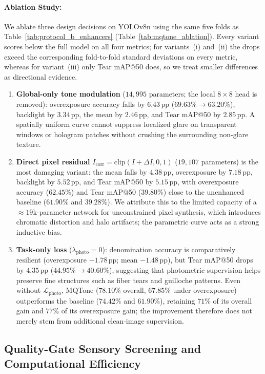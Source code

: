 \documentclass[final,5p,times,twocolumn,authoryear]{elsarticle}
\begin{document}
\paragraph{Ablation Study:}
We ablate three design decisions on YOLOv8n using the same five folds as Table~\ref{tab:protocol_b_enhancers} (Table~\ref{tab:mqtone_ablation}). Every variant scores below the full model on all four metrics; for variants~(i) and~(ii) the drops exceed the corresponding fold-to-fold standard deviations on every metric, whereas for variant~(iii) only Tear mAP@50 does, so we treat smaller differences as directional evidence.
\begin{enumerate}[label=(\roman*)]
    \item \textbf{Global-only tone modulation} ($14{,}995$ parameters; the local $8 \times 8$ head is removed): overexposure accuracy falls by $6.43$\,pp ($69.63\% \to 63.20\%$), backlight by $3.34$\,pp, the mean by $2.46$\,pp, and Tear mAP@50 by $2.85$\,pp. A spatially uniform curve cannot suppress localized glare on transparent windows or hologram patches without crushing the surrounding non-glare texture.
    \item \textbf{Direct pixel residual} $I_{\text{corr}} = \text{clip}(I + \Delta I, 0, 1)$ ($19{,}107$ parameters) is the most damaging variant: the mean falls by $4.38$\,pp, overexposure by $7.18$\,pp, backlight by $5.52$\,pp, and Tear mAP@50 by $5.15$\,pp, with overexposure accuracy ($62.45\%$) and Tear mAP@50 ($39.80\%$) close to the unenhanced baseline ($61.90\%$ and $39.28\%$). We attribute this to the limited capacity of a $\approx 19\text{k}$-parameter network for unconstrained pixel synthesis, which introduces chromatic distortion and halo artifacts; the parametric curve acts as a strong inductive bias.
    \item \textbf{Task-only loss} ($\lambda_{\text{photo}} = 0$): denomination accuracy is comparatively resilient (overexposure $-1.78$\,pp; mean $-1.48$\,pp), but Tear mAP@50 drops by $4.35$\,pp ($44.95\% \to 40.60\%$), suggesting that photometric supervision helps preserve fine structures such as fiber tears and guilloche patterns. Even without $\mathcal{L}_{\text{photo}}$, MQTone ($78.10\%$ overall, $67.85\%$ under overexposure) outperforms the baseline ($74.42\%$ and $61.90\%$), retaining $71\%$ of its overall gain and $77\%$ of its overexposure gain; the improvement therefore does not merely stem from additional clean-image supervision.
\end{enumerate}

\subsection{Quality-Gate Sensory Screening and Computational Efficiency}
\label{subsec:exp_quality_gate}
\end{document}
